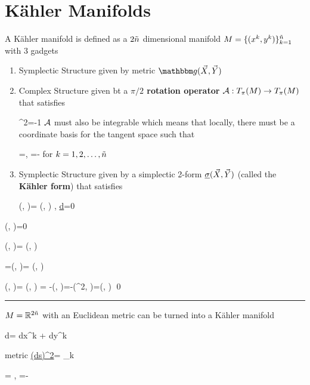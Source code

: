 \section{K\"ahler Manifolds}

A K\"{a}hler manifold 
is defined as a $2{\tilde{n}}$ dimensional manifold
$M=\{(x^k, y^k)\}_{k=1}^{\tilde{n}}$ with 3 
gadgets

\begin{enumerate}
\item
Symplectic Structure
given by  metric $\metric(\vecX, \vecY)$

\item 
Complex Structure given bt a {\bf $\pi/2$ rotation operator} ${\cal A}: T_\pi(M)\rightarrow T_\pi(M)$
that satisfies

\beq
\cala^2=-1
\eeq
${\cal A}$ must also be integrable which means that locally, there must be a coordinate basis for the tangent space such that

\beq
\cala{}=,
\quad
\cala {}=-\;
\eeq
for $k=1, 2, \ldots, {\tilde{n}}$


\item
Symplectic Structure given by a
simplectic 2-form $\ul{\s}(\vecX, \vecY)$ 
(called the {\bf K\"{a}hler form}) that satisfies

\beq
\ul{\s}(\vecX, \vecY)=
\metric(\cala\vecX, \vecY)
,\quad
\ul{d\s}=0
\eeq

\end{enumerate}

\begin{claim}

\beq
\metric(\cala \vecX, \vecX)=0
\eeq

\beq
\metric(\cala\vecX, \cala\vecY)=
\metric(\vecX, \vecY)
\eeq
\end{claim}
\proof

=\ul{\s}(\vecX, \vecX)=
\metric(\cala \vecX, \vecX)
\eeq


\beq
\metric(\cala\vecX, \cala\vecY)=
\ul{\s}(\vecX, \cala\vecY)
=
-\ul{\s}(\cala \vecY, \vecX)=-\metric(\cala^2\vecX, \vecY)=\metric(\vecX, \vecY)
\eeq
\qed

\hrule
$M={ \mathbb{R}}^{2{\tilde{n}}}$ 
with an Euclidean metric
can be turned into a K\"{a}hler manifold

\beq
d\vecr = dx^k 
+
dy^k
\eeq

metric
\beq
\ul{(ds)^2}=
\sum_k
\left[
(\ul{dx^k})^2
+
(\ul{dy^k})^2
\right]
\eeq

\beq
\cala {}=
,\quad
\cala
{}=-
\eeq

